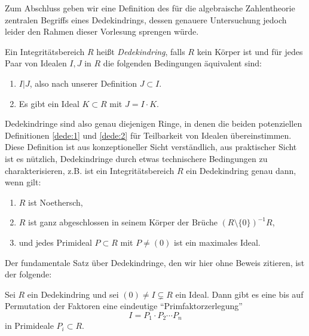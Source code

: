 \documentclass{book}
\begin{document}
Zum Abschluss geben wir eine Definition des für die algebraische Zahlentheorie
zentralen Begriffs eines Dedekindrings, dessen genauere Untersuchung jedoch
leider den Rahmen dieser Vorlesung sprengen würde.

\begin{defi}
    \label{defi:dedekind}
    Ein Integritätsbereich $R$ heißt \emph{Dedekindring}, falls $R$ kein Körper
    ist und für jedes Paar von Idealen $I,J$ in $R$ die folgenden Bedingungen
    äquivalent sind:
    \begin{enumerate}[label=(\roman *)]
        \item\label{dede:1} $I | J$, also nach unserer Definition $J \subset I$.
        \item\label{dede:2} Es gibt ein Ideal $K \subset R$ mit $J = I \cdot K$.  
    \end{enumerate}
\end{defi}

\begin{rem}
    \label{rem:dedekind} Dedekindringe sind also genau diejenigen Ringe, in
    denen die beiden potenziellen Definitionen \eqref{dede:1} und
    \eqref{dede:2} für Teilbarkeit von Idealen übereinstimmen.
    Diese Definition ist aus konzeptioneller Sicht verständlich, aus
    praktischer Sicht ist es nützlich, Dedekindringe durch etwas technischere
    Bedingungen zu charakterisieren, z.B. ist ein Integritätsbereich $R$ ein Dedekindring genau dann,
    wenn gilt:
    \begin{enumerate}
        \item $R$ ist Noethersch,
        \item $R$ ist ganz abgeschlossen in seinem Körper der Brüche $(R \setminus \{0\})^{-1}R$,
        \item und jedes Primideal $P \subset R$ mit $P \ne (0)$ ist ein maximales Ideal.
    \end{enumerate}
\end{rem}

Der fundamentale Satz über Dedekindringe, den wir hier ohne Beweis zitieren, ist der folgende: 

\begin{thm}
    \label{thm:dedekindfaktorisierung}
    Sei $R$ ein Dedekindring und sei $(0) \ne I \subsetneq R$ ein Ideal. Dann
    gibt es eine bis auf Permutation der Faktoren eine eindeutige
    ``Primfaktorzerlegung''
    \[
        I = P_1 \cdot P_2 \cdots P_n
    \]
    in Primideale $P_i \subset R$.
\end{thm}
\end{document}
